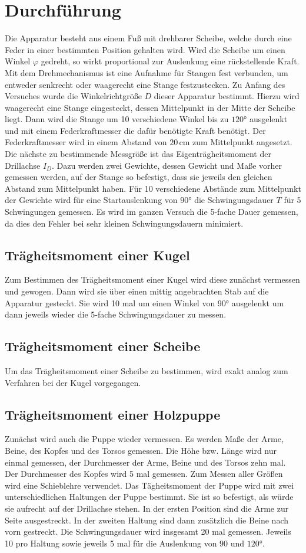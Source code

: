 \section{Durchführung}
\label{sec:Durchführung}
Die Apparatur besteht aus einem Fuß mit drehbarer Scheibe, welche durch eine Feder in einer bestimmten 
Position gehalten wird. Wird die Scheibe um einen Winkel $\varphi$ gedreht, so wirkt proportional zur Auslenkung 
eine rückstellende Kraft. Mit dem Drehmechanismus ist eine Aufnahme für Stangen fest verbunden, um entweder
senkrecht oder waagerecht eine Stange festzustecken.  
Zu Anfang des Versuches wurde die Winkelrichtgröße $D$ dieser Apparatur bestimmt. Hierzu wird waagerecht eine Stange 
eingesteckt, dessen Mittelpunkt in der Mitte der Scheibe liegt. Dann wird die Stange um 10 verschiedene Winkel bis zu 
$120°$ ausgelenkt und mit einem Federkraftmesser die dafür benötigte Kraft benötigt. Der Federkraftmesser wird 
in einem Abstand von $20$\,cm zum Mittelpunkt angesetzt. Die nächste zu bestimmende Messgröße ist das 
Eigenträgheitsmoment der Drillachse $I_D$. Dazu werden zwei Gewichte, dessen Gewicht und Maße vorher gemessen werden,
auf der Stange so befestigt, dass sie jeweils den gleichen Abstand zum Mittelpunkt haben.
Für 10 verschiedene Abstände zum Mittelpunkt der Gewichte wird für eine Startauslenkung 
von $90°$ die Schwingungsdauer $T$ für 5 Schwingungen gemessen. Es wird im ganzen Versuch die 5-fache Dauer gemessen, 
da dies den Fehler bei sehr kleinen Schwingungsdauern minimiert.
\subsection{Trägheitsmoment einer Kugel}
Zum Bestimmen des Trägheitsmoment einer Kugel wird diese zunächst vermessen und gewogen. Dann wird sie über einen mittig
angebrachten Stab auf die Apparatur gesteckt. Sie wird 10 mal um einen Winkel von 90° ausgelenkt um dann jeweils wieder 
die 5-fache Schwingungsdauer zu messen. 
\subsection{Trägheitsmoment einer Scheibe}
Um das Trägheitsmoment einer Scheibe zu bestimmen, wird exakt analog zum Verfahren bei der Kugel vorgegangen.
\subsection{Trägheitsmoment einer Holzpuppe}
Zunächst wird auch die Puppe wieder vermessen. Es werden Maße der Arme, Beine, des Kopfes und des Torsos gemessen. Die 
Höhe bzw. Länge wird nur einmal gemessen, der Durchmesser der Arme, Beine und des Torsos zehn mal. Der Durchmesser des 
Kopfes wird 5 mal gemessen. Zum Messen aller Größen wird eine Schieblehre verwendet. Das Tägheitsmoment der Puppe wird 
mit zwei unterschiedlichen Haltungen der Puppe bestimmt. Sie ist so befestigt, als würde sie aufrecht auf der Drillachse 
stehen. In der ersten Position sind die Arme zur Seite ausgestreckt. In der zweiten Haltung sind dann zusätzlich die 
Beine nach vorn gestreckt. Die Schwingungsdauer wird insgesamt 20 mal gemessen. Jeweils 10 pro Haltung sowie jeweils 
5 mal für die Auslenkung von $90$ und $120°$.
